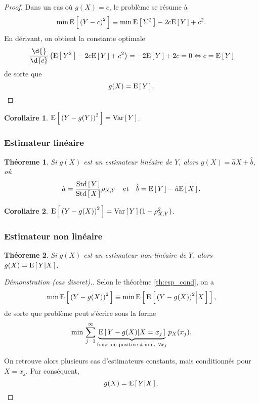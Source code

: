 \documentclass[11pt]{article}
\newcommand\Esp[1]{%
	\ensuremath{%
		\mathrm{E}\left[\,#1\,\right]%
	}%
}%
\newcommand\Espg[2]{%
	\ensuremath{%
		\mathrm{E}\left[\,#1\middle\vert#2\,\right]%
	}%
}%
\newcommand\Var[1]{%
	\ensuremath{%
		\mathrm{Var}\left[\,#1\,\right]%
	}%
}%
\newcommand\Std[1]{%
	\ensuremath{%
		\mathrm{Std}\left[\,#1\,\right]%
	}%
}%
\newcommand\Min{%
	\ensuremath{%
		\mathrm{min}\,%
	}%
}%
\newtheorem{theoreme}{Théoreme}[section]
\newtheorem*{corollary}{Corollaire}
\theoremstyle{remark}
\theoremstyle{definition}
\begin{document}
\begin{proof}
	Dans un cas où $g(X)=c$, le problème se résume à
	\begin{equation*}
		\Min\Esp{\left(Y-c\right)^2}\equiv
		\Min\Esp{Y^2}-2c\Esp{Y}+c^2.
	\end{equation*}
	En dérivant, on obtient la constante optimale
	\begin{equation*}
		\frac{\d{}}{\d{c}}\left(\Esp{Y^2}-2c\Esp{Y}+c^2\right)
		=-2\Esp{Y}+2c=0
		\Leftrightarrow c=\Esp{Y}
	\end{equation*}
	de sorte que
	\begin{equation*}
		g(X)=\Esp{Y}.\qedhere
	\end{equation*}
\end{proof}

\begin{corollary}
	$\Esp{\left(Y-g(Y)\right)^2}=\Var{Y}$.
\end{corollary}

\subsubsection{Estimateur linéaire}
\begin{theoreme}
	Si $g(X)$ est un estimateur linéaire de $Y$, alors $g(X)=\hat{a}X+\hat{b}$,
	où
	\begin{equation*}
		\hat{a}=\frac{\Std{Y}}{\Std{X}}\rho_{X,Y}
		\quad\text{et}\quad
		\hat{b}=\Esp{Y}-\hat{a}\Esp{X}.
	\end{equation*}
\end{theoreme}

\begin{corollary}
	$\Esp{\left(Y-g(X)\right)^2}=\Var{Y}(1-\rho_{X,Y}^2)$.
\end{corollary}

\subsubsection{Estimateur non linéaire}
\begin{theoreme}
	Si $g(X)$ est un estimateur non-linéaire de $Y$, alors $g(X)=\Espg{Y}{X}$.
\end{theoreme}

\begin{proof}[Démonstration (cas discret).]
	Selon le théorème \ref{th:esp_cond}, on a
	\begin{equation*}
		\Min\Esp{\left(Y-g(X)\right)^2}\equiv
		\Min\Esp{\Espg{\left(Y-g(X)\right)^2}{X}},
	\end{equation*}
	de sorte que problème peut s'écrire sous la forme
	\begin{equation*}
		\Min\sum_{j=1}^\infty\underbrace{\Espg{Y-g(X)}{X=x_j}}_{\text{fonction
		positive à min. $\forall x_j$}}p_X(x_j).
	\end{equation*}

	On retrouve alors plusieurs cas d'estimateurs constants, mais conditionnés
	pour $X=x_j$. Par conséquent,
	\begin{equation*}
		g(X)=\Espg{Y}{X}.\qedhere
	\end{equation*}
\end{proof}
\end{document}

